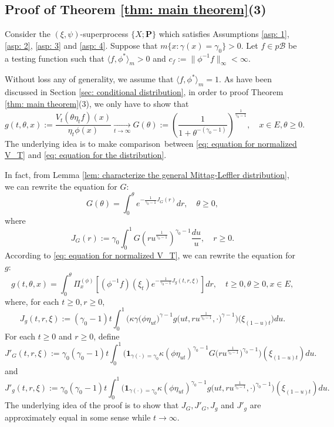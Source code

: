 \documentclass[12pt, a4paper]{amsart}
\theoremstyle{definition}
\numberwithin{equation}{section}
\begin{document}
\subsection{Proof of Theorem \ref{thm: main theorem}(3)}
\label{sec: proof of result 3}
	Consider the $(\xi, \psi)$-superprocess $\{X;\mathbf P\}$ which satisfies Assumptions \ref{asp: 1}, \ref{asp: 2}, \ref{asp: 3} and \ref{asp: 4}.
	Suppose that $m\{ x:\gamma(x)=\gamma_0 \}>0$. 
	Let $f \in p\mathscr B$ be a testing function such that $ \langle f, \phi^* \rangle_m > 0$  and $c_f:=\| \phi^{-1}f \|_\infty < \infty$.
	
	Without loss any of generality, we assume that $\langle f, \phi^* \rangle_m = 1$.
	As have been discussed in Section \ref{sec: conditional distribution}, in order to proof Theorem \ref{thm: main theorem}(3), we only have to show that
\[
	g(t,\theta,x)
	:=\frac{V_t (\theta \eta_t f) (x)}{\eta_t \phi(x)} 
	\xrightarrow[t\to \infty]{} G(\theta)
	:= ( \frac{1}{1+\theta^{-(\gamma_0 - 1)}} )^{ \frac{1}{\gamma_0 - 1} },
	\quad x\in E, \theta \geq 0.
\]
	The underlying idea is to make comparison between \eqref{eq: equation for normalized V_T} and \eqref{eq: equation for the distribution}.
	
	In fact, from Lemma \ref{lem: characterize the general Mittag-Leffler distribution}, we can rewrite the equation for $G$:
\[\label{eq: equation for G}
	G(\theta)
	= \int_0^\theta e^{ - \frac{1} {\gamma_0 - 1} J_G(r)} dr,
	\quad \theta \geq 0,
\]
	where
\[\label{eq: definition for J_G}
	J_G(r):=
	\gamma_0 \int_0^1 G(ru^{\frac{1}{\gamma_0 - 1}}) ^{\gamma_0 - 1}\frac{du}{u},
	\quad r\geq 0 .
\]
	According to \eqref{eq: equation for normalized V_T}, we can rewrite the equation for $g$:
\[\label{eq: equation for g}
	g(t,\theta, x)= \int_0^{\theta} \Pi_x^{(\phi)} [ (\phi^{-1}f)(\xi_t) e^{-\frac{1}{\gamma_0 - 1} J_g(t,r,\xi) } ] dr,
	\quad t\geq 0, \theta \geq 0, x\in E,
\]
	where, for each $t\geq 0, r\geq 0$,
\[\label{eq: definition for J_g}
	J_g(t,r,\xi):=
	(\gamma_0 - 1)t\int_0^1 \Big(  \kappa\gamma \big(   \phi \eta_{ut}   \big)^{\gamma - 1} g \big(ut,ru^{\frac{1}{\gamma_0 - 1}},\cdot \big)^{\gamma-1}  \Big) \big(  \xi_{(1-u)t}  \big) du.
\]
	For each $t\geq 0$ and $r\geq 0$, define
\[\label{eq: definition of J'_G}
	J'_G(t,r,\xi):=
	\gamma_0 (\gamma_0 - 1) t \int_0^1 \Big( \mathbf 1_{\gamma(\cdot) = \gamma_0} \kappa (\phi \eta_{ut})^{\gamma_0 - 1} G\big( ru^{\frac{1}{\gamma_0 - 1}} \big) ^{\gamma_0 - 1} \Big) (\xi_{(1-u)t}) du.
\]
	and
\[\label{eq: definition of J'_g}
	J'_g(t,r,\xi):= 
	\gamma_0 (\gamma_0 - 1) t \int_0^1 \Big( \mathbf 1_{\gamma(\cdot) = \gamma_0} \kappa (\phi \eta_{ut})^{\gamma_0 - 1} g\big( ut,ru^{\frac{1}{\gamma_0 - 1}}, \cdot \big)^{\gamma_0 - 1}  \Big) (\xi_{(1-u)t})  du.
\]
	The underlying idea of the proof is to show that $J_G,J'_G,J_g$ and $J'_g$ are approximately equal in some sense while $t\to \infty$.
	
\end{document}
